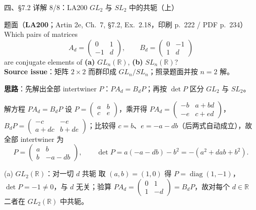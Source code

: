 \documentclass[aspectratio=169,10pt,fontset=none]{ctexbeamer}
\newcommand{\ex}[1]{\textcolor{accent}{\footnotesize\bfseries #1}}
\newcommand{\key}[1]{\textcolor{ink}{\bfseries #1}}
\begin{document}
\begin{frame}[t]{四、\S7.2 详解 8/8：LA200 $GL_2$ 与 $SL_2$ 中的共轭（上）}
\label{ex:LA200}
\scriptsize
\begin{block}{\footnotesize 题面（\ex{LA200}；Artin 2e, Ch.~7, \S7.2, Ex.~2.18，印刷 p.~222 / PDF p.~234）}
Which pairs of matrices
\[
A_d=\begin{pmatrix}0&1\\-1&d\end{pmatrix},\qquad
B_d=\begin{pmatrix}0&-1\\1&d\end{pmatrix}
\]
are conjugate elements of \textbf{(a)} $GL_n(\mathbb R)$, \textbf{(b)} $SL_n(\mathbb R)$?\\
{\color{accent}\textbf{Source issue}：矩阵 $2\times2$ 而群印成 $GL_n/SL_n$；照录题面并按 $n=2$ 解。}
\end{block}
\key{思路}：先解出全部 intertwiner $P$：$PA_d=B_dP$；再按 $\det P$ 区分 $GL_2$ 与 $SL_2$。
\begin{block}{\footnotesize 解方程 $PA_d=B_dP$}
设 $P=\begin{pmatrix}a&b\\c&e\end{pmatrix}$，乘开得 $PA_d=\begin{pmatrix}-b&a+bd\\-e&c+ed\end{pmatrix}$，$B_dP=\begin{pmatrix}-c&-e\\a+dc&b+de\end{pmatrix}$；比较得 $c=b$、$e=-a-db$（后两式自动成立），故全部 intertwiner 为
\[
P=\begin{pmatrix}a&b\\b&-a-db\end{pmatrix},\qquad
\det P=a(-a-db)-b^2=-(a^2+dab+b^2).
\]
\end{block}
\begin{block}{\footnotesize (a) $GL_2(\mathbb R)$：对一切 $d$ 共轭}
取 $(a,b)=(1,0)$ 得 $P=\operatorname{diag}(1,-1)$，$\det P=-1\ne0$，与 $d$ 无关；验算 $PA_d=\begin{pmatrix}0&1\\1&-d\end{pmatrix}=B_dP$，故对每个 $d\in\mathbb R$ 二者在 $GL_2(\mathbb R)$ 中共轭。
\end{block}
\end{frame}
\end{document}
